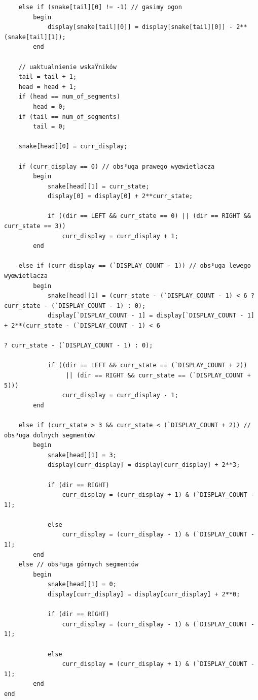 \documentclass[a4paper]{article}
\begin{document}
\begin{verbatim}
    else if (snake[tail][0] != -1) // gasimy ogon
        begin
            display[snake[tail][0]] = display[snake[tail][0]] - 2**(snake[tail][1]);
        end
        
    // uaktualnienie wskaŸników
    tail = tail + 1;
    head = head + 1;
    if (head == num_of_segments)
        head = 0;
    if (tail == num_of_segments)
        tail = 0;
    
    snake[head][0] = curr_display;

    if (curr_display == 0) // obs³uga prawego wyœwietlacza
        begin           
            snake[head][1] = curr_state;
            display[0] = display[0] + 2**curr_state;
            
            if ((dir == LEFT && curr_state == 0) || (dir == RIGHT && curr_state == 3))
                curr_display = curr_display + 1;
        end
    
    else if (curr_display == (`DISPLAY_COUNT - 1)) // obs³uga lewego wyœwietlacza
        begin
            snake[head][1] = (curr_state - (`DISPLAY_COUNT - 1) < 6 ? curr_state - (`DISPLAY_COUNT - 1) : 0);
            display[`DISPLAY_COUNT - 1] = display[`DISPLAY_COUNT - 1] + 2**(curr_state - (`DISPLAY_COUNT - 1) < 6 
                                                                            ? curr_state - (`DISPLAY_COUNT - 1) : 0);
            
            if ((dir == LEFT && curr_state == (`DISPLAY_COUNT + 2)) 
                 || (dir == RIGHT && curr_state == (`DISPLAY_COUNT + 5)))
                curr_display = curr_display - 1;
        end
                
    else if (curr_state > 3 && curr_state < (`DISPLAY_COUNT + 2)) // obs³uga dolnych segmentów
        begin
            snake[head][1] = 3;
            display[curr_display] = display[curr_display] + 2**3;
            
            if (dir == RIGHT)
                curr_display = (curr_display + 1) & (`DISPLAY_COUNT - 1);
            
            else
                curr_display = (curr_display - 1) & (`DISPLAY_COUNT - 1);
        end
    else // obs³uga górnych segmentów
        begin
            snake[head][1] = 0;
            display[curr_display] = display[curr_display] + 2**0;
            
            if (dir == RIGHT)
                curr_display = (curr_display - 1) & (`DISPLAY_COUNT - 1);

            else
                curr_display = (curr_display + 1) & (`DISPLAY_COUNT - 1);
        end
end




\end{verbatim}
\end{document}
